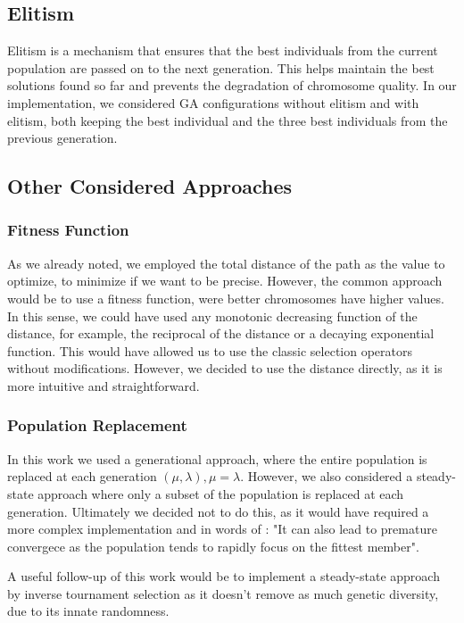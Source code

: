 \documentclass[12pt]{article}
\begin{document}
\subsection{Elitism}
Elitism is a mechanism that ensures that the best individuals from the current population are passed on to the next generation. This helps maintain the best solutions found so far and prevents the degradation of chromosome quality. In our implementation, we considered GA configurations without elitism and with elitism, both keeping the best individual and the three best individuals from the previous generation.

\subsection{Other Considered Approaches}
\subsubsection{Fitness Function}
As we already noted, we employed the total distance of the path as the value to optimize, to minimize if we want to be precise. However, the common approach would be to use a fitness function, were better chromosomes have higher values. In this sense, we could have used any monotonic decreasing function of the distance, for example, the reciprocal of the distance or a decaying exponential function. This would have allowed us to use the classic selection operators without modifications. However, we decided to use the distance directly, as it is more intuitive and straightforward.

\subsubsection{Population Replacement}
In this work we used a generational approach, where the entire population is replaced at each generation $(\mu,\lambda), \mu=\lambda$. However, we also considered a steady-state approach where only a subset of the population is replaced at each generation. Ultimately we decided not to do this, as it would have required a more complex implementation and in words of \cite{Eiben2003}: "It can also lead to premature convergece as the population tends to rapidly focus on the fittest member". 

A useful follow-up of this work would be to implement a steady-state approach by inverse tournament selection as it doesn't remove as much genetic diversity, due to its innate randomness.
\end{document}
